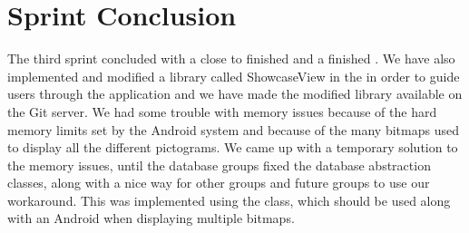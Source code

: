 
\chapter{Sprint Conclusion}
\label{cha:conclusion_sprint_3}

The third sprint concluded with a close to finished \ct and a finished . We have also implemented and modified a library called ShowcaseView in the \ct in order to guide users through the application and we have made the modified library available on the \giraf Git server. We had some trouble with memory issues because of the hard memory limits set by the Android system and because of the many bitmaps used to display all the different pictograms. We came up with a temporary solution to the memory issues, until the database groups fixed the database abstraction classes, along with a nice way for other groups and future groups to use our workaround. This was implemented using the  class, which should be used along with an Android  when displaying multiple bitmaps.

